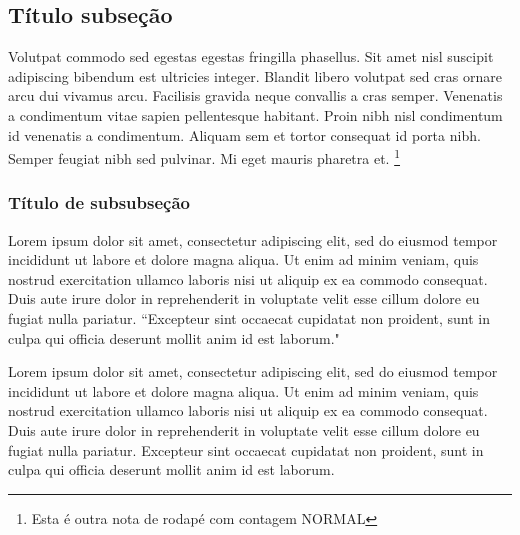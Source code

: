 \documentclass[12pt]{article}
\begin{document}
		\subsection{Título subseção}
		Volutpat commodo sed egestas egestas fringilla phasellus. Sit amet nisl suscipit adipiscing bibendum est ultricies integer. Blandit libero volutpat sed cras ornare arcu dui vivamus arcu. Facilisis gravida neque convallis a cras semper. Venenatis a condimentum vitae sapien pellentesque habitant. Proin nibh nisl condimentum id venenatis a condimentum. Aliquam sem et tortor consequat id porta nibh. Semper feugiat nibh sed pulvinar. Mi eget mauris pharetra et. \footnote{Esta é outra nota de rodapé com contagem NORMAL}

		
		\subsubsection{Título de subsubseção}
		Lorem ipsum dolor sit amet, consectetur adipiscing elit, sed do eiusmod tempor incididunt ut labore et dolore magna aliqua. Ut enim ad minim veniam, quis nostrud exercitation ullamco laboris nisi ut aliquip ex ea commodo consequat. Duis aute irure dolor in reprehenderit in voluptate velit esse cillum dolore eu fugiat nulla pariatur. ``Excepteur sint occaecat cupidatat non proident, sunt in culpa qui officia deserunt mollit anim id est laborum."
		
		Lorem ipsum dolor sit amet, consectetur adipiscing elit, sed do eiusmod tempor incididunt ut labore et dolore magna aliqua. Ut enim ad minim veniam, quis nostrud exercitation ullamco laboris nisi ut aliquip ex ea commodo consequat. Duis aute irure dolor in reprehenderit in voluptate velit esse cillum dolore eu fugiat nulla pariatur. Excepteur sint occaecat cupidatat non proident, sunt in culpa qui officia deserunt mollit anim id est laborum.
		
		\newpage
	\SetWatermarkText{}
	\nocite{alchemist_pauloc} %
\end{document}
